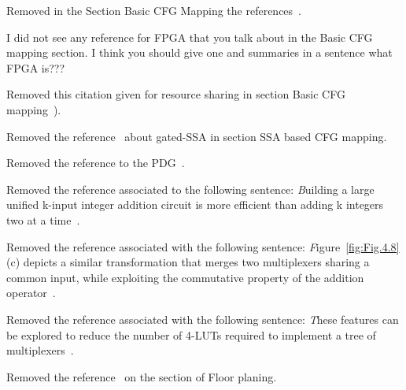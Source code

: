 Removed in the Section Basic CFG Mapping the references~\cite{Hormati:CASES08,Kaplan:DAC03}.

I did not see any reference for FPGA that you talk about in the Basic CFG mapping section. I think you should give one and summaries in a sentence what FPGA is???

Removed this citation given for resource sharing in section Basic CFG mapping~\cite{Memik:DAC03}).

Removed the reference~\cite{Tu-SC95} about gated-SSA in section SSA based CFG mapping.

Removed the reference to the PDG~\cite{Ferrante-TOPLAS87}. 

Removed the reference associated to the following sentence: {\emph Building a large unified k-input integer addition circuit is more
efficient than adding k integers two at a time~\cite{Stelling98,Wallace64}. }

Removed the reference associated with the following sentence: {\emph Figure~\ref{fig:Fig.4.8}(c) depicts a similar transformation that 
merges two multiplexers sharing a common input, while exploiting
the commutative property of the addition operator~\cite{Verma08}.}

Removed the reference associated with the following sentence: {\emph These features can be explored to reduce the number 
of 4-LUTs required to implement a tree of multiplexers~\cite{Nancekievill05}.}

Removed the reference~\cite{Kaplan:DAC03} on the section of Floor planing.
